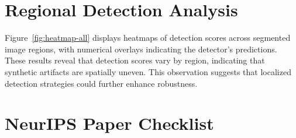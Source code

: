\documentclass{article}
\begin{document}
\section{Regional Detection Analysis} 
\label{sec:patch-evaluation}
Figure~\ref{fig:heatmap-all} displays heatmaps of detection scores across segmented image regions, with numerical overlays indicating the detector’s predictions. These results reveal that detection scores vary by region, indicating that synthetic artifacts are spatially uneven. This observation suggests that localized detection strategies could further enhance robustness.


\newpage
\section*{NeurIPS Paper Checklist}



\end{document}
